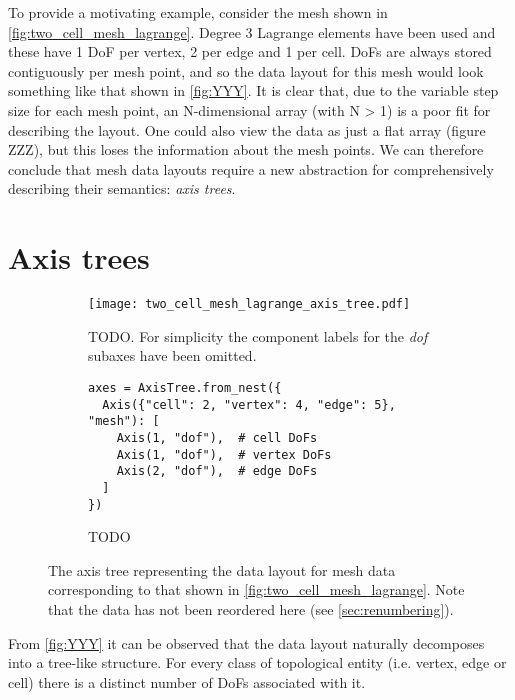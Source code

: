 \documentclass[thesis]{subfiles}
\begin{document}
To provide a motivating example, consider the mesh shown in \cref{fig:two_cell_mesh_lagrange}. %
Degree 3 Lagrange elements have been used and these have 1 DoF per vertex, 2 per edge and 1 per cell.
DoFs are always stored contiguously per mesh point, and so the data layout for this mesh would look something like that shown in \cref{fig:YYY}.  %
It is clear that, due to the variable step size for each mesh point, an N-dimensional array (with N > 1) is a poor fit for describing the layout.
One could also view the data as just a flat array (figure ZZZ), but this loses the information about the mesh points.  %
We can therefore conclude that mesh data layouts require a new abstraction for comprehensively describing their semantics: \textit{axis trees}.

\section{Axis trees}

\begin{figure}
  \centering
  \begin{subfigure}{.6\textwidth}
    \centering
    \texttt{[image: two\_cell\_mesh\_lagrange\_axis\_tree.pdf]}
    \caption{
      TODO.
      For simplicity the component labels for the \textit{dof} subaxes have been omitted.
    }
    \label{fig:two_cell_mesh_lagrange_axis_tree}
  \end{subfigure}
  \vspace{1em}
  \begin{subfigure}{\textwidth}
    \centering
    \begin{verbatim}
axes = AxisTree.from_nest({
  Axis({"cell": 2, "vertex": 4, "edge": 5}, "mesh"): [
    Axis(1, "dof"),  # cell DoFs
    Axis(1, "dof"),  # vertex DoFs
    Axis(2, "dof"),  # edge DoFs
  ]
})
    \end{verbatim}
    \caption{TODO}
    \label{fig:two_cell_mesh_lagrange_code}
  \end{subfigure}
  \caption{
    The axis tree representing the data layout for mesh data corresponding to that shown in \cref{fig:two_cell_mesh_lagrange}.
    Note that the data has not been reordered here (see \cref{sec:renumbering}).
  }
  \label{fig:two_cell_mesh_lagrange_pyop3}
\end{figure}

From \cref{fig:YYY} it can be observed that the data layout naturally decomposes into a tree-like structure.
For every class of topological entity (i.e. vertex, edge or cell) there is a distinct number of DoFs associated with it.
\end{document}
